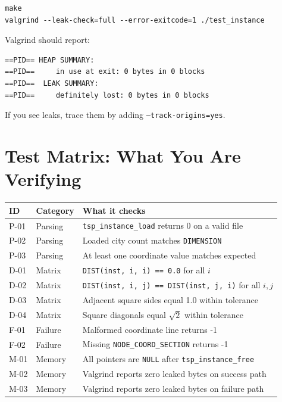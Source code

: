 \begin{lstlisting}[style=shellstyle]
make
valgrind --leak-check=full --error-exitcode=1 ./test_instance
\end{lstlisting}

Valgrind should report:
\begin{lstlisting}[style=shellstyle]
==PID== HEAP SUMMARY:
==PID==     in use at exit: 0 bytes in 0 blocks
==PID==  LEAK SUMMARY:
==PID==     definitely lost: 0 bytes in 0 blocks
\end{lstlisting}

If you see leaks, trace them by adding \texttt{--track-origins=yes}.

\newpage

\section{Test Matrix: What You Are Verifying}

\begin{center}
\renewcommand{\arraystretch}{1.6}
\begin{tabularx}{\textwidth}{llX}
\toprule
\textbf{ID} & \textbf{Category} & \textbf{What it checks} \\
\midrule
P-01 & Parsing & \texttt{tsp\_instance\_load} returns 0 on a valid file \\
P-02 & Parsing & Loaded city count matches \texttt{DIMENSION} \\
P-03 & Parsing & At least one coordinate value matches expected \\
D-01 & Matrix  & \texttt{DIST(inst, i, i) == 0.0} for all $i$ \\
D-02 & Matrix  & \texttt{DIST(inst, i, j) == DIST(inst, j, i)} for all $i, j$ \\
D-03 & Matrix  & Adjacent square sides equal 1.0 within tolerance \\
D-04 & Matrix  & Square diagonals equal $\sqrt{2}$ within tolerance \\
F-01 & Failure & Malformed coordinate line returns -1 \\
F-02 & Failure & Missing \texttt{NODE\_COORD\_SECTION} returns -1 \\
M-01 & Memory  & All pointers are \texttt{NULL} after \texttt{tsp\_instance\_free} \\
M-02 & Memory  & Valgrind reports zero leaked bytes on success path \\
M-03 & Memory  & Valgrind reports zero leaked bytes on failure path \\
\bottomrule
\end{tabularx}
\end{center}

\newpage
